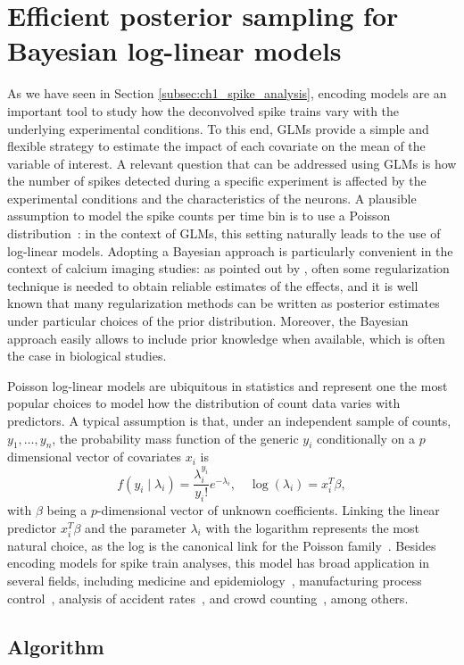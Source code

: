 \chapter{Efficient posterior sampling for Bayesian log-linear models}



As we have seen in Section \ref{subsec:ch1_spike_analysis}, encoding models are an important tool to study how the deconvolved spike trains vary with the underlying experimental conditions. To this end, GLMs provide a simple and flexible strategy to estimate the impact of each covariate on the mean of the variable of interest.
A relevant question that can be addressed using GLMs is how the number of spikes detected during a specific experiment is affected by the experimental conditions and the characteristics of the neurons. A plausible assumption to model the spike counts per time bin is to use a Poisson distribution~\citep{paninski2007}: in the context of GLMs, this setting naturally leads to the use of log-linear models. 
Adopting a Bayesian approach is particularly convenient in the context of calcium imaging studies: as pointed out by \citet{paninski2007}, often some regularization technique is needed to obtain reliable estimates of the effects, and it is well known that many regularization methods can be written as posterior estimates under particular choices of the prior distribution.
Moreover, the Bayesian approach easily allows to include prior knowledge when available, which is often the case in biological studies. 

Poisson log-linear models are ubiquitous in statistics and represent one the most popular choices to model how the distribution of count data varies with predictors. A typical assumption is that, under an independent sample of counts, $y_1, \dots, y_n$, the probability mass function of the generic $y_i$ conditionally on a $p$ dimensional vector of covariates $x_i$ is
\begin{equation*}
f(y_i \mid \lambda_i) =  \frac {\lambda_i^{y_i}}{{y_i}!}e^{-\lambda_i}, \quad \log(\lambda_i) = x_i^T \beta,
\label{eq:model0}
\end{equation*}
with $\beta$ being a $p$-dimensional vector of unknown coefficients. Linking the linear predictor $x_i^T \beta$ and the parameter $\lambda_i$ with the logarithm represents the most natural choice, as the log is the canonical link for the Poisson family~\citep{nelder1972glm}.
Besides encoding models for spike train analyses, this model has broad application in several fields, including medicine and epidemiology~\citep{Frome1983, frome1985, Hutchinson2005}, manufacturing process control~\citep{lambert1992}, analysis of accident rates~\citep{Sarath1990, Miaou1994}, and crowd counting~\citep{chan2009}, among others.



\section{Algorithm} 
\noindent

